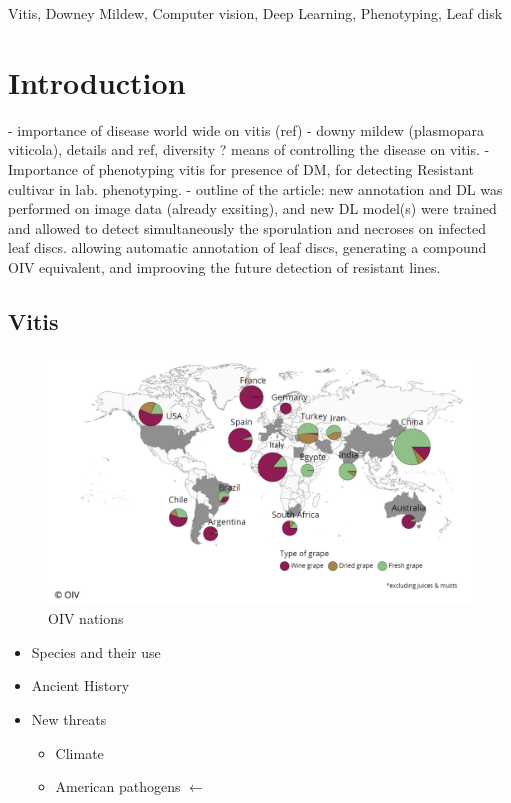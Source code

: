 \documentclass[english]{article}
\begin{document}
\begin{keywords}
    Vitis, Downey Mildew, Computer vision, Deep Learning, Phenotyping, Leaf disk
\end{keywords}


\tableofcontents

\section{Introduction}

- importance of disease world wide on vitis (ref)
- downy mildew (plasmopara viticola), details and ref, diversity ? means of controlling the disease on vitis.
- Importance of phenotyping vitis for presence of DM, for detecting Resistant cultivar in lab. phenotyping.
- outline of the article: new annotation and DL was performed on image data (already exsiting), and new DL model(s) were trained and allowed to detect simultaneously the sporulation and necroses on infected leaf discs. allowing automatic annotation of leaf discs, generating a compound OIV equivalent, and improoving the future  detection of resistant lines.


\subsection{Vitis}

\begin{figure}[H]
	\begin{center}
		\includegraphics[width=0.7\linewidth]{2023_cdt_oiv_world.png}
		\caption{OIV nations}\label{fig:oivworld}
	\end{center}
\end{figure}

\begin{itemize}
    \item Species and their use
    \item Ancient History
    \item New threats
    \begin{itemize}
        \item Climate
        \item American pathogens $\leftarrow$
    \end{itemize}
\end{itemize}
\end{document}
